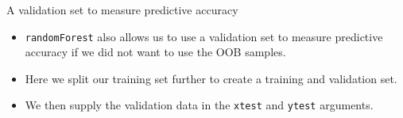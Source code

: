 \documentclass[10pt,ignorenonframetext,]{beamer}
\newenvironment{Shaded}{}{}
\newcommand{\KeywordTok}[1]{\textcolor[rgb]{0.00,0.00,1.00}{#1}}
\newcommand{\DecValTok}[1]{#1}
\newcommand{\StringTok}[1]{\textcolor[rgb]{0.00,0.50,0.50}{#1}}
\newcommand{\CommentTok}[1]{\textcolor[rgb]{0.00,0.50,0.00}{#1}}
\newcommand{\OperatorTok}[1]{#1}
\newcommand{\NormalTok}[1]{#1}
\providecommand{\tightlist}{%
  \setlength{\itemsep}{0pt}\setlength{\parskip}{0pt}}
\begin{document}
\begin{frame}[fragile]{A validation set to measure predictive accuracy}

\begin{itemize}
\tightlist
\item
  \texttt{randomForest} also allows us to use a validation set to
  measure predictive accuracy if we did not want to use the OOB samples.
\item
  Here we split our training set further to create a training and
  validation set.
\item
  We then supply the validation data in the \texttt{xtest} and
  \texttt{ytest} arguments.
\end{itemize}

\begin{Shaded}
\end{Shaded}

\end{frame}
\end{document}
